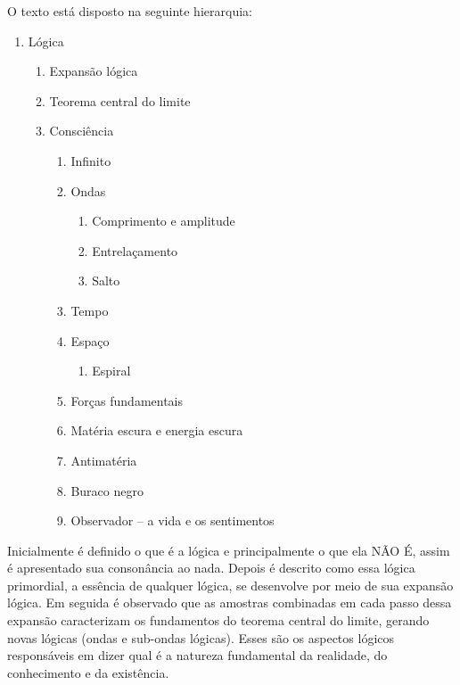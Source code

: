 \noindent O texto está disposto na seguinte hierarquia:
	\begin{enumerate}[label*=\arabic*.]
	   \item Lógica
	   \begin{enumerate}[label*=\arabic*.]
		   \item Expansão lógica
		   \item Teorema central do limite
		   \item Consciência
			   \begin{enumerate}[label*=\arabic*.]
				   \item Infinito
				   \item Ondas 
				   \begin{enumerate}[label*=\arabic*.]
				   		\item Comprimento e amplitude
				   		\item Entrelaçamento
				   		\item Salto
				   \end{enumerate}  
				   \item Tempo
				   \item Espaço
				   \begin{enumerate}[label*=\arabic*.]
				   		\item Espiral
				   \end{enumerate} 
				   \item Forças fundamentais
				   \item Matéria escura e energia escura
				   \item Antimatéria
				   \item Buraco negro
				   \item Observador – a vida e os sentimentos
			   \end{enumerate}   
	   \end{enumerate}
	\end{enumerate}

Inicialmente é definido o que é a lógica e principalmente o que ela NÃO É, assim é apresentado sua consonância ao nada. Depois é descrito como essa lógica primordial, a essência de qualquer lógica, se desenvolve por meio de sua expansão lógica. Em seguida é observado que as amostras combinadas em cada passo dessa expansão caracterizam os fundamentos do teorema central do limite, gerando novas lógicas (ondas e sub-ondas lógicas). Esses são os aspectos lógicos responsáveis em dizer qual é a natureza fundamental da realidade, do conhecimento e da existência. 

\bigbreak